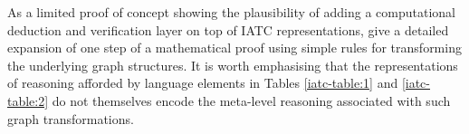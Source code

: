 \documentclass[smallextended,oneside]{svjour3}       %
\newenvironment{listing}[1]
    {\begin{mylisting}
    \def\mycaption{#1}
    \begin{mdframed}[middlelinecolor=black,
   middlelinewidth=1pt,
   backgroundcolor=gray!0,
   innerleftmargin=6pt,
   usetwoside=false,
   leftmargin=.4cm,
   userdefinedwidth=.97\textwidth,
   roundcorner=7pt]
    \begingroup
    }{
    \endgroup
    \end{mdframed}
    \caption{\mycaption}
    \end{mylisting}
    }
\begin{document}
As a limited proof of concept showing the plausibility of adding a
computational deduction and verification layer on top of IATC
representations, \citet{corneli2017modelling} give a detailed
expansion of one step of a mathematical proof using simple rules
for transforming the underlying graph structures.
It is worth emphasising that the representations
of reasoning afforded by language elements in Tables
\ref{iatc-table:1} and \ref{iatc-table:2} do not themselves
encode the meta-level reasoning associated with such graph transformations.

\end{document}
